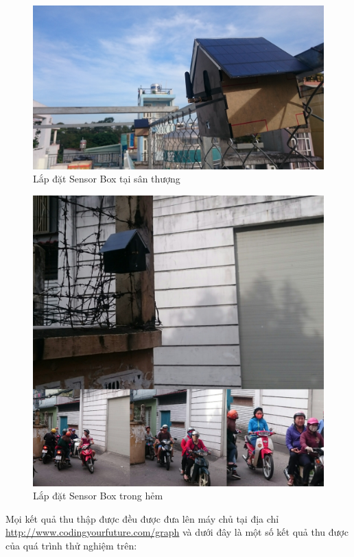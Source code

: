 \begin{figure}[H]
	\centering    
	\includegraphics[width=6in]{sensorbox_1}
	\caption[Lắp đặt Sensor Box tại sân thượng]{Lắp đặt Sensor Box tại sân thượng}
	\label{fig:sensorbox_1}
\end{figure}
\begin{figure}[H]
	\centering    
	\includegraphics[width=6in]{sensorbox_2}
	\caption[Lắp đặt Sensor Box trong hẻm]{Lắp đặt Sensor Box trong hẻm}
	\label{fig:sensorbox_2}
\end{figure}


Mọi kết quả thu thập được đều được đưa lên máy chủ tại địa chỉ \url{http://www.codingyourfuture.com/graph}
 và dưới đây là một số kết quả thu được của quá trình thử nghiệm trên:

